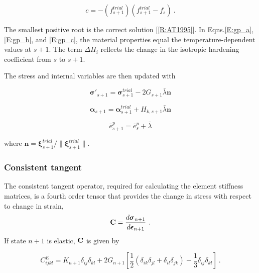 \documentclass[11pt]{report}
\numberwithin{equation}{section}
\newcommand{\bmf } {\boldsymbol }
\begin{document}
\begin{equation}\label{E:gp_c}
c =  - \left( f_{s+1}^{trial} \right)
\left( f_{s+1}^{trial} - f_s \right)~.
\end{equation}

\noindent The smallest positive root is the correct solution [\ref{R:AT1995}]. In 
Eqns.\;\eqref{E:gp_a}, \eqref{E:gp_b}, and \eqref{E:gp_c}, the material
properties equal the temperature-dependent values at $s+1$. The term $\Delta H_i$ reflects
the change in the isotropic hardening coefficient from $s$ to $s+1$. 

The stress and internal variables are then updated with

\begin{equation}
{\bmf{\sigma }}{'_{s + 1}} = {\bmf{\sigma }}_{s + 1}^{trial} - 2G_{s+1}\bar \lambda {\bmf{n}}
\end{equation}

\begin{equation}
{{\bmf{\alpha }}_{s + 1}} = {{\bmf{\alpha }}_{s+1}^{trial}} + {H_{k,s+1}}\bar \lambda {\bmf{n}}
\end{equation}

\begin{equation}
\bar e_{s + 1}^p = \bar e_s^p + \bar \lambda 
\end{equation}

\noindent where $\bmf n = \bmf \xi^{trial}_{s+1} / \parallel
 \bmf \xi^{trial}_{s+1} \parallel$. 
 
 
\subsubsection {Consistent tangent}

The consistent tangent operator, required for calculating the element stiffness matrices, 
is a fourth order tensor that provides the change in stress with respect to change in strain,
\begin{equation}
{\bf{C}} = \frac{{d{{\bmf{\sigma }}_{n + 1}}}}{{d{\bmf{\epsilon}_{n + 1}}}}~.
\end{equation}
\noindent If state $n+1$ is elastic, $\bf C$ is given by

\begin{equation}
C_{ijkl}^E = K_{n+1}{\delta _{ij}}{\delta _{kl}} + 
2G_{n+1}\left[ {\frac{1}{2}\left( {{\delta _{ik}}
{\delta _{jl}} + {\delta _{il}}{\delta _{jk}}} \right) - \frac{1}{3}{\delta _{ij}}{\delta _{kl}}} \right]~.
\end{equation}
\end{document}
